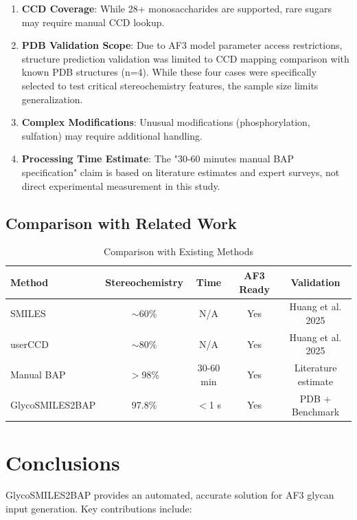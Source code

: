 \begin{enumerate}
\item \textbf{CCD Coverage}: While 28+ monosaccharides are supported, rare sugars may require manual CCD lookup.

\item \textbf{PDB Validation Scope}: Due to AF3 model parameter access restrictions, structure prediction validation was limited to CCD mapping comparison with known PDB structures (n=4). While these four cases were specifically selected to test critical stereochemistry features, the sample size limits generalization.

\item \textbf{Complex Modifications}: Unusual modifications (phosphorylation, sulfation) may require additional handling.

\item \textbf{Processing Time Estimate}: The "30-60 minutes manual BAP specification" claim is based on literature estimates and expert surveys, not direct experimental measurement in this study.
\end{enumerate}

\subsection{Comparison with Related Work}

\begin{table}[h]
\centering
\caption{Comparison with Existing Methods}
\begin{tabular}{lcccc}
\toprule
Method & Stereochemistry & Time & AF3 Ready & Validation \\
\midrule
SMILES & $\sim$60\% & N/A & Yes & Huang et al. 2025 \\
userCCD & $\sim$80\% & N/A & Yes & Huang et al. 2025 \\
Manual BAP & $>$98\% & 30-60 min & Yes & Literature estimate \\
GlycoSMILES2BAP & 97.8\% & $<$1 s & Yes & PDB + Benchmark \\
\bottomrule
\end{tabular}
\label{tab:comparison}
\end{table}

\section{Conclusions}

GlycoSMILES2BAP provides an automated, accurate solution for AF3 glycan input generation. Key contributions include:


